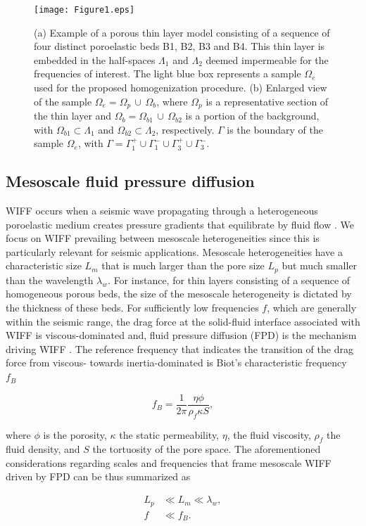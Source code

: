 \documentclass[draft]{agujournal2019}
\begin{document}
\begin{figure}[!ht]
\centering
        \texttt{[image: Figure1.eps]}
\caption{ (a) Example of a porous thin layer model consisting of a sequence of four distinct poroelastic beds B1, B2, B3 and B4. This thin layer is embedded in the half-spaces $\Lambda_1$ and $\Lambda_2$ deemed impermeable for the frequencies of interest. The light blue box represents a sample $\Omega_e$ used for the proposed homogenization procedure. (b) Enlarged view of the sample $\Omega_e = \Omega_p \, \cup \, \Omega_b$, where  $\Omega_p$ is a representative section of the thin layer and  $\Omega_b= \Omega_{b1}  \, \cup \, \Omega_{b2}$ is a portion of the background, with $\Omega_{b1} \subset \Lambda_1$ and $\Omega_{b2} \subset \Lambda_2$, respectively. $\Gamma$ is the boundary of the  sample $\Omega_e$, with  $\Gamma = \Gamma_1^+ \cup \Gamma_1^- \cup \Gamma_3^+ \cup \Gamma_3^-$.
}
\label{fig.1}
\end{figure}

\subsection{Mesoscale fluid pressure diffusion}
WIFF occurs when a seismic wave propagating through a heterogeneous poroelastic medium creates
pressure gradients that equilibrate by fluid flow \cite{Muller2010}.
We focus on WIFF prevailing between mesoscale heterogeneities since this is particularly relevant for seismic applications. Mesoscale heterogeneities have a characteristic size $L_m$ that is much larger than the pore size $L_p$ but much smaller than the wavelength $\lambda_w$. For instance, for thin layers consisting of a sequence of homogeneous porous beds, the size of the mesoscale heterogeneity is dictated by the thickness of these beds.
For sufficiently low frequencies $f$, which are generally within the seismic range, the drag force at the solid-fluid interface associated with WIFF is viscous-dominated \cite{Johnson1987} and, fluid pressure diffusion (FPD) is the mechanism driving WIFF \cite{Pride2005}. The reference frequency that indicates the transition of the drag force from viscous- towards inertia-dominated is Biot's characteristic frequency $f_B$ \cite{Biot1956, Dutta1979}
\begin{linenomath*}
\begin{equation}\label{Eq.1}
f_B= \frac{1}{2 \pi} \frac{\eta \phi}{ \rho_f \kappa S },
\end{equation}
\end{linenomath*}
where $\phi$ is the porosity, $\kappa$  the static permeability, $\eta$, the fluid viscosity,  $\rho_f$ the fluid density, and $S$ the tortuosity of the pore space. The aforementioned considerations regarding scales and frequencies that frame mesoscale WIFF driven by FPD can be thus summarized as
\begin{linenomath*}
\begin{equation}\label{Eq.2}
\begin{split}
 L_p & \ll L_m \ll \lambda_w, \\
f & \ll f_B.
\end{split}
\end{equation}
\end{linenomath*}
\end{document}
